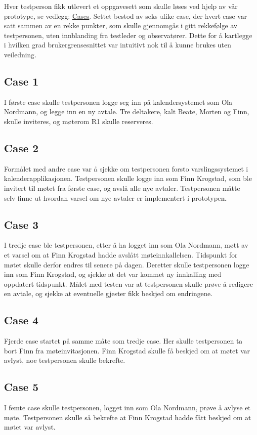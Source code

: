 Hver testperson fikk utlevert et oppgavesett som skulle løses ved hjelp av vår prototype, se vedlegg: \hyperlink{vedlegg/cases.pdf.1}{Cases}. Settet bestod av seks ulike case, der hvert case var satt sammen av en rekke punkter, som skulle gjennomgås i gitt rekkefølge av testpersonen, uten innblanding fra testleder og observatører. Dette for å kartlegge i hvilken grad brukergrensesnittet var intuitivt nok til å kunne brukes uten veiledning.

\subsection{Case 1}
	I første case skulle testpersonen logge seg inn på kalendersystemet som Ola Nordmann, og legge inn en ny avtale. Tre deltakere, kalt Beate, Morten og Finn, skulle inviteres, og møterom R1 skulle reserveres.

\subsection{Case 2}
	Formålet med andre case var å sjekke om testpersonen forsto varslingssystemet i kalenderapplikasjonen. Testpersonen skulle logge inn som Finn Krogstad, som ble invitert til møtet fra første case, og avslå alle nye avtaler. Testpersonen måtte selv finne ut hvordan varsel om nye avtaler er implementert i prototypen.

\subsection{Case 3}
	I tredje case ble testpersonen, etter å ha logget inn som Ola Nordmann, møtt av et varsel om at Finn Krogstad hadde avslått møteinnkallelsen. Tidspunkt for møtet skulle derfor endres til senere på dagen. Deretter skulle testpersonen logge inn som Finn Krogstad, og sjekke at det var kommet ny innkalling med oppdatert tidspunkt. Målet med testen var at testpersonen skulle prøve å redigere en avtale, og sjekke at eventuelle gjester fikk beskjed om endringene.

\subsection{Case 4}
	Fjerde case startet på samme måte som tredje case. Her skulle testpersonen ta bort Finn fra møteinvitasjonen. Finn Krogstad skulle få beskjed om at møtet var avlyst, noe testpersonen skulle bekrefte.

\subsection{Case 5}
	I femte case skulle testpersonen, logget inn som Ola Nordmann, prøve å avlyse et møte. Testpersonen skulle så bekrefte at Finn Krogstad hadde fått beskjed om at møtet var avlyst.

